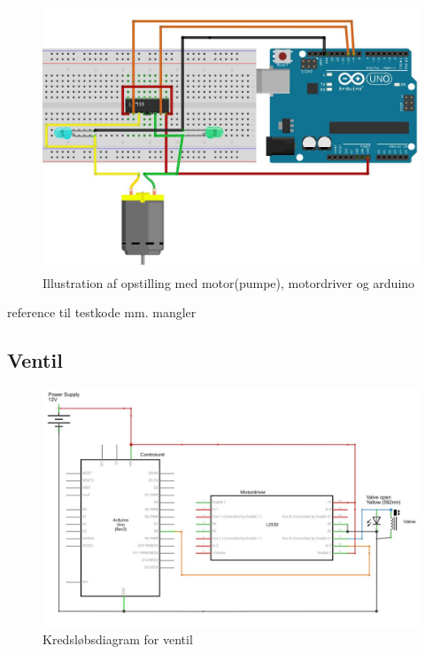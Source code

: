  \begin{figure}[H]
	\centering
	\includegraphics[width=1\textwidth]{billeder/Hardware/diagrammer/Motorbreadboard.JPG}
	\caption{Illustration af opstilling med motor(pumpe), motordriver og arduino}
	\label{fig:Motorbreadboard}
\end{figure}

reference til testkode mm. mangler


 \subsection{Ventil}
 
\begin{figure}[H]
	\centering
	\includegraphics[width=1\textwidth]{billeder/Hardware/diagrammer/ventildiagram.JPG}
	\caption{Kredsløbsdiagram for ventil}
	\label{fig:ventildiagram}
\end{figure} 

